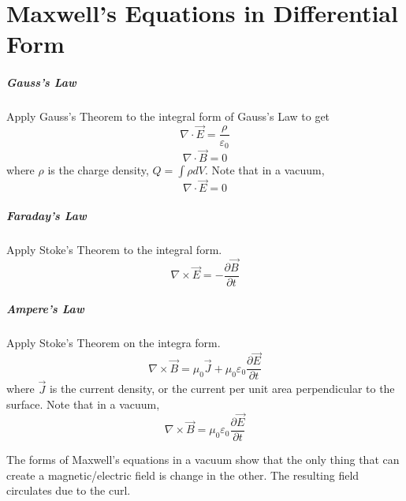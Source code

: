 \documentclass[11pt]{article}
\begin{document}
\section{Maxwell's Equations in Differential Form}
	\subparagraph{Gauss's Law} Apply Gauss's Theorem to the integral form of Gauss's Law to get
	\begin{equation}
		\nabla \cdot \vec{E} = \frac{\rho}{\varepsilon_0}
	\end{equation}
	\begin{equation}
		\nabla \cdot \vec{B} = 0
	\end{equation}
	where $\rho$ is the charge density, $Q = \int \rho dV$. Note that in a vacuum,
	\begin{equation}
		\nabla \cdot \vec{E} = 0
	\end{equation}
	
	\subparagraph{Faraday's Law} Apply Stoke's Theorem to the integral form.
	\begin{equation}
		\nabla \times \vec{E} = -\frac{\partial \vec{B}}{\partial t}
	\end{equation}
	
	\subparagraph{Ampere's Law} Apply Stoke's Theorem on the integra form.
	\begin{equation}
		\nabla \times \vec{B} = \mu_0 \vec{J} + \mu_0 \varepsilon_0 \frac{\partial \vec{E}}{\partial t}
	\end{equation}
	where $\vec{J}$ is the current density, or the current per unit area perpendicular to the surface. Note that in a vacuum,
	\begin{equation}
		\nabla \times \vec{B} = \mu_0 \varepsilon_0 \frac{\partial \vec{E}}{\partial t}
	\end{equation}
	
	The forms of Maxwell's equations in a vacuum show that the only thing that can create a magnetic/electric field is change in the other. The resulting field circulates due to the curl.
	
\end{document}
